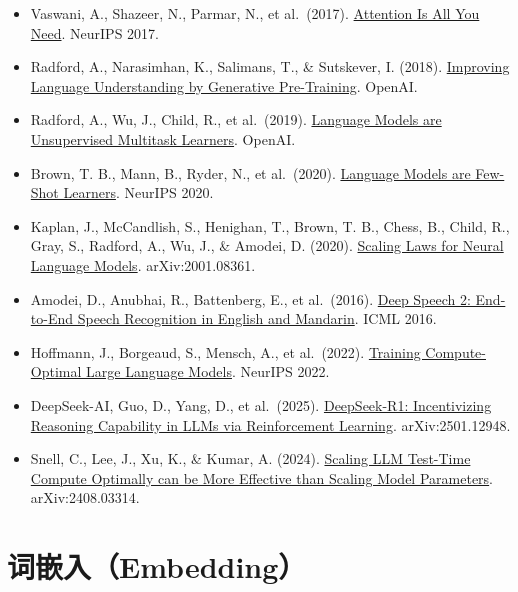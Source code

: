 \vspace{0.25em}
\begin{itemize}
\tightlist
\item
  Vaswani, A., Shazeer, N., Parmar, N., et al.~(2017). \href{https://arxiv.org/abs/1706.03762}{Attention Is All You Need}. NeurIPS 2017.
\item
  Radford, A., Narasimhan, K., Salimans, T., \& Sutskever, I. (2018). \href{https://cdn.openai.com/research-covers/language-unsupervised/language_understanding_paper.pdf}{Improving Language Understanding by Generative Pre-Training}. OpenAI.
\item
  Radford, A., Wu, J., Child, R., et al.~(2019). \href{https://cdn.openai.com/better-language-models/language_models_are_unsupervised_multitask_learners.pdf}{Language Models are Unsupervised Multitask Learners}. OpenAI.
\item
  Brown, T. B., Mann, B., Ryder, N., et al.~(2020). \href{https://arxiv.org/abs/2005.14165}{Language Models are Few-Shot Learners}. NeurIPS 2020.
\item
  Kaplan, J., McCandlish, S., Henighan, T., Brown, T. B., Chess, B., Child, R., Gray, S., Radford, A., Wu, J., \& Amodei, D. (2020). \href{https://arxiv.org/abs/2001.08361}{Scaling Laws for Neural Language Models}. arXiv:2001.08361.
\item
  Amodei, D., Anubhai, R., Battenberg, E., et al.~(2016). \href{https://arxiv.org/abs/1512.02595}{Deep Speech 2: End-to-End Speech Recognition in English and Mandarin}. ICML 2016.
\item
  Hoffmann, J., Borgeaud, S., Mensch, A., et al.~(2022). \href{https://arxiv.org/abs/2203.15556}{Training Compute-Optimal Large Language Models}. NeurIPS 2022.
\item
  DeepSeek-AI, Guo, D., Yang, D., et al.~(2025). \href{https://arxiv.org/abs/2501.12948}{DeepSeek-R1: Incentivizing Reasoning Capability in LLMs via Reinforcement Learning}. arXiv:2501.12948.
\item
  Snell, C., Lee, J., Xu, K., \& Kumar, A. (2024). \href{https://arxiv.org/abs/2408.03314}{Scaling LLM Test-Time Compute Optimally can be More Effective than Scaling Model Parameters}. arXiv:2408.03314.
\end{itemize}

\clearpage

\hypertarget{ux8bcdux5d4cux5165embedding}{%
\section{词嵌入（Embedding）}\label{ux8bcdux5d4cux5165embedding}}

